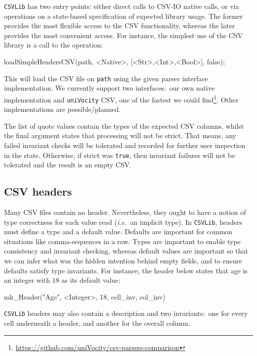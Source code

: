 \documentclass[runningheads,a4paper]{llncs}
\begin{document}
\texttt{CSVLib} has two entry points: either direct calls to CSV-IO native calls, or via operations on a state-based specification of expected library usage. The former provides the most flexible access to the CSV functionality, whereas the later provides the most convenient access. For instance, the simplest use of the CSV library is a call to the operation:
%
\begin{vdmsl}[frame=none,basicstyle=\ttfamily\scriptsize]
    loadSimpleHeadersCSV(path, <Native>, [<Str>,<Int>,<Bool>], false);
\end{vdmsl}
%
This will load the CSV file on \texttt{path} using the given parser interface implementation. We currently support two interfaces:~our own native implementation and \texttt{uniVocity} CSV, one of the fastest we could find\footnote{\url{https://github.com/uniVocity/csv-parsers-comparison}}. Other implementations are possible/planned. 

The list of quote values contain the types of the expected CSV columns, whilst the final argument states that processing will not be strict. That means, any failed invariant checks will be tolerated and recorded for further user inspection in the state. Otherwise, if strict was \texttt{true}, then invariant failures will not be tolerated and the result is an empty CSV\@.      

\subsection*{CSV headers}\label{subsec:Headers}

Many CSV files contain no header. Nevertheless, they ought to have a notion of type correctness for each value read (\textit{i.e.}~an implicit type). In \texttt{CSVLib}, headers must define a type and a default value. Defaults are important for common situations like comma-sequences in a row. Types are important to enable type consistency and invariant checking, whereas default values are important so that we can infer what was the hidden intention behind empty fields, and to ensure defaults satisfy type invariants. For instance, the header below states that age is an integer with \(18\) as its default value:
%
\begin{vdmsl}[frame=none,basicstyle=\ttfamily\scriptsize]
    mk_Header("Age", <Integer>, 18, cell_inv, col_inv)
\end{vdmsl}
%
\texttt{CSVLib} headers may also contain a description and two invariants:~one for every cell underneath a header, and another for the overall column.  
\end{document}
